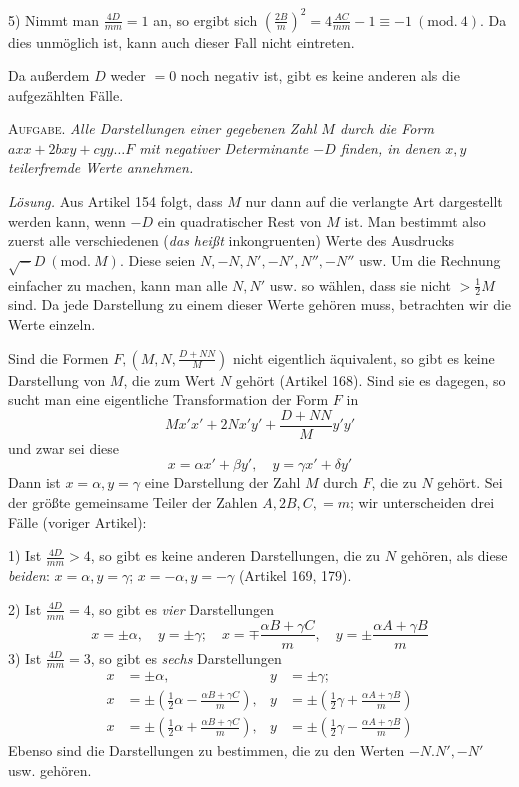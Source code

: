 5) Nimmt man $\frac{4D}{mm}=1$ an, so ergibt sich $(\frac{2B}{m})^2=4\frac{AC}{mm}-1\equiv-1\ (\mathrm{mod.}\ 4)$. Da dies unmöglich ist, kann auch dieser Fall nicht eintreten.

Da außerdem $D$ weder $=0$ noch negativ ist, gibt es keine anderen als die aufgezählten Fälle.

\textsc{Aufgabe.} \textit{Alle Darstellungen einer gegebenen Zahl $M$ durch die Form $axx+2bxy+cyy\ldots F$ mit negativer Determinante $-D$ finden, in denen $x,y$ teilerfremde Werte annehmen.}

\textit{Lösung.} Aus Artikel 154 folgt, dass $M$ nur dann auf die verlangte Art dargestellt werden kann, wenn $-D$ ein quadratischer Rest von $M$ ist. Man bestimmt also zuerst alle verschiedenen (\textit{das heißt} inkongruenten) Werte des Ausdrucks $\surd-D\ (\mathrm{mod.}\ M)$. Diese seien $N,-N,N',-N',N'',-N''$ usw. Um die Rechnung einfacher zu machen, kann man alle $N,N'$ usw. so wählen, dass sie nicht $>\tfrac12M$ sind. Da jede Darstellung zu einem dieser Werte gehören muss, betrachten wir die Werte einzeln.

Sind die Formen $F,(M,N,\frac{D+NN}{M})$ nicht eigentlich äquivalent, so gibt es keine Darstellung von $M$, die zum Wert $N$ gehört (Artikel 168). Sind sie es dagegen, so sucht man eine eigentliche Transformation der Form $F$ in
\[
Mx'x'+2Nx'y'+\frac{D+NN}{M}y'y'
\]
und zwar sei diese
\[
x=\alpha x'+\beta y',\quad y=\gamma x'+\delta y'
\]
Dann ist $x=\alpha,y=\gamma$ eine Darstellung der Zahl $M$ durch $F$, die zu $N$ gehört. Sei der größte gemeinsame Teiler der Zahlen $A,2B,C,=m$; wir unterscheiden drei Fälle (voriger Artikel):

1) Ist $\frac{4D}{mm}>4$, so gibt es keine anderen Darstellungen, die zu $N$ gehören, als diese \textit{beiden}: $x=\alpha,y=\gamma$; $x=-\alpha,y=-\gamma$ (Artikel 169, 179).

2) Ist $\frac{4D}{mm}=4$, so gibt es \textit{vier} Darstellungen
\[
x=\pm\alpha,\quad y=\pm\gamma;\quad x=\mp\frac{\alpha B+\gamma C}{m},\quad y=\pm\frac{\alpha A+\gamma B}{m}
\]
3) Ist $\frac{4D}{mm}=3$, so gibt es \textit{sechs} Darstellungen
\[
\begin{aligned}
x&=\pm\alpha,&y&=\pm\gamma;\\
x&=\pm(\tfrac12\alpha-\tfrac{\alpha B+\gamma C}{m}),&y&=\pm(\tfrac12\gamma+\tfrac{\alpha A+\gamma B}{m})\\
x&=\pm(\tfrac12\alpha+\tfrac{\alpha B+\gamma C}{m}),&y&=\pm(\tfrac12\gamma-\tfrac{\alpha A+\gamma B}{m})
\end{aligned}
\]
Ebenso sind die Darstellungen zu bestimmen, die zu den Werten $-N.N',-N'$ usw. gehören.


